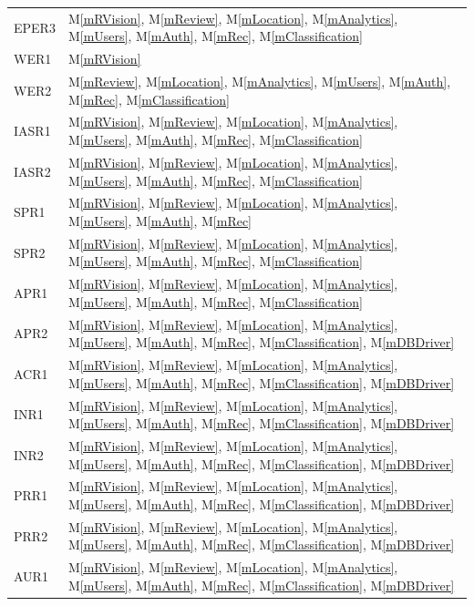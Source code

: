 \documentclass[12pt, titlepage]{article}
\newcommand{\mref}[1]{M\ref{#1}}
\begin{document}
\begin{longtable}{p{} p{}}
EPER3 & \mref{mRVision}, \mref{mReview}, \mref{mLocation}, \mref{mAnalytics}, \mref{mUsers}, \mref{mAuth}, \mref{mRec}, \mref{mClassification}\\
WER1 & \mref{mRVision}\\
WER2 & \mref{mReview}, \mref{mLocation}, \mref{mAnalytics}, \mref{mUsers}, \mref{mAuth}, \mref{mRec}, \mref{mClassification}\\
IASR1 & \mref{mRVision}, \mref{mReview}, \mref{mLocation}, \mref{mAnalytics}, \mref{mUsers}, \mref{mAuth}, \mref{mRec}, \mref{mClassification}\\
IASR2 & \mref{mRVision}, \mref{mReview}, \mref{mLocation}, \mref{mAnalytics}, \mref{mUsers}, \mref{mAuth}, \mref{mRec}, \mref{mClassification}\\
SPR1 & \mref{mRVision}, \mref{mReview}, \mref{mLocation}, \mref{mAnalytics}, \mref{mUsers}, \mref{mAuth}, \mref{mRec}\\
SPR2 & \mref{mRVision}, \mref{mReview}, \mref{mLocation}, \mref{mAnalytics}, \mref{mUsers}, \mref{mAuth}, \mref{mRec}, \mref{mClassification}\\
APR1 & \mref{mRVision}, \mref{mReview}, \mref{mLocation}, \mref{mAnalytics}, \mref{mUsers}, \mref{mAuth}, \mref{mRec}, \mref{mClassification}\\
APR2 & \mref{mRVision}, \mref{mReview}, \mref{mLocation}, \mref{mAnalytics}, \mref{mUsers}, \mref{mAuth}, \mref{mRec}, \mref{mClassification}, \mref{mDBDriver}\\
ACR1 & \mref{mRVision}, \mref{mReview}, \mref{mLocation}, \mref{mAnalytics}, \mref{mUsers}, \mref{mAuth}, \mref{mRec}, \mref{mClassification}, \mref{mDBDriver}\\
INR1 & \mref{mRVision}, \mref{mReview}, \mref{mLocation}, \mref{mAnalytics}, \mref{mUsers}, \mref{mAuth}, \mref{mRec}, \mref{mClassification}, \mref{mDBDriver}\\
INR2 & \mref{mRVision}, \mref{mReview}, \mref{mLocation}, \mref{mAnalytics}, \mref{mUsers}, \mref{mAuth}, \mref{mRec}, \mref{mClassification}, \mref{mDBDriver}\\
PRR1 & \mref{mRVision}, \mref{mReview}, \mref{mLocation}, \mref{mAnalytics}, \mref{mUsers}, \mref{mAuth}, \mref{mRec}, \mref{mClassification}, \mref{mDBDriver}\\
PRR2 & \mref{mRVision}, \mref{mReview}, \mref{mLocation}, \mref{mAnalytics}, \mref{mUsers}, \mref{mAuth}, \mref{mRec}, \mref{mClassification}, \mref{mDBDriver}\\
AUR1 & \mref{mRVision}, \mref{mReview}, \mref{mLocation}, \mref{mAnalytics}, \mref{mUsers}, \mref{mAuth}, \mref{mRec}, \mref{mClassification}, \mref{mDBDriver}\\

\end{longtable}
\end{document}
